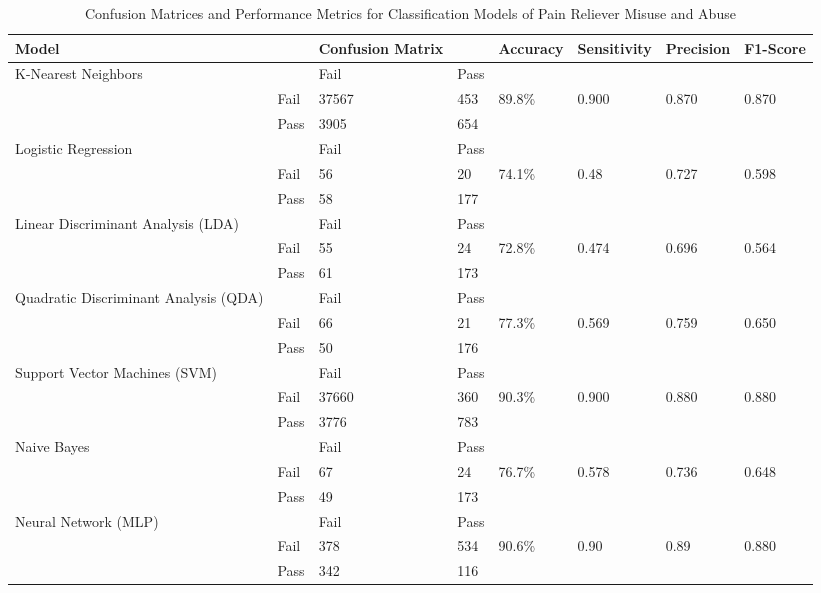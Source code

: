 





 
\begin{table*}[ht]
  \caption{Confusion Matrices and Performance Metrics for Classification 
  Models of Pain Reliever Misuse and Abuse}
  \label{tab:freq}
  \begin{tabular}{llllllll}
    \toprule
    Model& & Confusion Matrix & & Accuracy & Sensitivity & Precision & F1-Score \\
    \midrule
    K-Nearest Neighbors & & Fail & Pass &  &  &  & \\
     & Fail & 37567 & 453 & 89.8\% & 0.900 & 0.870 & 0.870 \\
     & Pass & 3905 & 654 &  &  &  & \\
    
    \midrule
    Logistic Regression & & Fail & Pass &  &  &  & \\
     & Fail & 56 &  20 & 74.1\% & 0.48 & 0.727 & 0.598 \\
     & Pass & 58 & 177 &  &  &  & \\
    \midrule
    Linear Discriminant Analysis (LDA) & & Fail & Pass &  &  &  & \\
     & Fail & 55 &  24 & 72.8\% & 0.474 & 0.696 & 0.564 \\
     & Pass & 61 & 173 &  &  &  & \\
    \midrule
    Quadratic Discriminant Analysis (QDA) & & Fail & Pass &  &  &  & \\
     & Fail & 66 &  21 & 77.3\% & 0.569 & 0.759 & 0.650 \\
     & Pass & 50 & 176 &  &  &  & \\
    
    \midrule
    Support Vector Machines (SVM) & & Fail & Pass &  &  &  & \\
     & Fail & 37660 & 360 & 90.3\% & 0.900 & 0.880 & 0.880 \\
     & Pass & 3776 & 783 &  &  &  & \\
    \midrule
    Naive Bayes & & Fail & Pass &  &  &  & \\
     & Fail & 67 &  24 & 76.7\% & 0.578 & 0.736 & 0.648 \\
     & Pass & 49 & 173 &  &  &  & \\
    \midrule
    Neural Network (MLP) & & Fail & Pass &  &  &  & \\
     & Fail & 378 & 534 & 90.6\% & 0.90 & 0.89 & 0.880 \\
     & Pass & 342 & 116 &  &  &  & \\
    

\end{tabular}
\end{table*}
